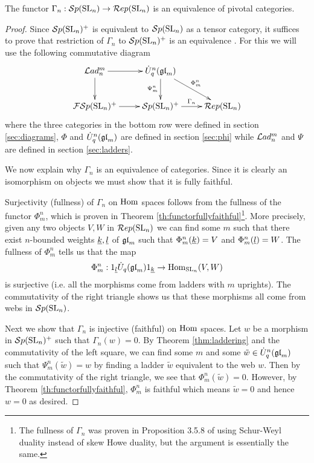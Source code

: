 \documentclass[11pt,leqno]{article}
\begin{document}
\begin{thm}\label{thm:main}
The functor $\Gamma_n: {\mathcal{S}p}({\rm{SL}}_n) \rightarrow \mathcal{R}ep({\rm{SL}}_n)$ is an equivalence of pivotal categories.
\end{thm}
\begin{proof}
Since ${\mathcal{S}p}({\rm{SL}}_n)^+ $ is equivalent to $ {\mathcal{S}p}({\rm{SL}}_n) $ as a tensor category, it suffices to prove that restriction of $ \Gamma_n $ to $ {\mathcal{S}p}({\rm{SL}}_n)^+ $ is an equivalence . For this we will use the following commutative diagram
\begin{equation}\label{diag:main}
\xymatrix{
\Lad_n^m \ar[r] \ar[d] & \dU^n(\gl_m) \ar[dr]^{\Phi_m^n} \ar[d]_{\Psi_m^n} & \\
\FSp(\SL_n)^+ \ar[r] & \Sp(\SL_n)^+ \ar[r]^{\Gamma_n} & \Rep(\SL_n) \\
}
\end{equation}
where the three categories in the bottom row were defined in section \ref{sec:diagrams}, $\Phi$ and $\dot{{{U}}}_q^n({\mathfrak{gl}}_m)$ are defined in section \ref{sec:phi} while $\mathcal{L}ad_n^m$ and $\Psi$ are defined in section \ref{sec:ladders}.

We now explain why $\Gamma_n$ is an equivalence of categories. Since it is clearly an isomorphism on objects we must show that it is fully faithful.

Surjectivity (fullness) of $\Gamma_n$ on $\operatorname{Hom}$ spaces follows from the fullness of the functor $ \Phi^n_m $, which is proven in Theorem \ref{th:functorfullyfaithful}\footnote{The fullness of $\Gamma_n$ was proven in Proposition 3.5.8 of \cite{0704.1503} using Schur-Weyl duality instead of skew Howe duality, but the argument is essentially the same.}.  More precisely, given any two objects $ V, W $ in $\mathcal{R}ep({\rm{SL}}_n) $ we can find some $m$ such that there exist $ n$-bounded weights $ {\underline{k}}, {\underline{l}} $ of $ {\mathfrak{gl}}_m$ such that $\Phi^n_m({\underline{k}}) = V$ and $\Phi^n_m({\underline{l}}) = W $. The fullness of $ \Phi^n_m $ tells us that the map
$$ \Phi^n_m : 1_{{\underline{l}}} \dot{{{U}}}_q({\mathfrak{gl}}_m) 1_{{\underline{k}}} \rightarrow \operatorname{Hom}_{{\rm{SL}}_n}(V, W) $$
is surjective (i.e. all the morphisms come from ladders with $m$ uprights). The commutativity of the right triangle shows us that these morphisms all come from webs in $ {\mathcal{S}p}({\rm{SL}}_n) $.

Next we show that $ \Gamma_n $ is injective (faithful) on $ \operatorname{Hom}$ spaces.  Let $w$ be a morphism in $ {\mathcal{S}p}({\rm{SL}}_n)^+ $ such that $\Gamma_n(w)=0$.  By Theorem \ref{thm:laddering} and the commutativity of the left square, we can find some $ m $ and some $\tilde{w} \in \dot{{{U}}}_q^n({\mathfrak{gl}}_m) $ such that $ \Psi^n_m(\tilde{w}) = w $ by finding a ladder $ \tilde{w} $ equivalent to the web $ w $. Then by the commutativity of the right triangle, we see that $ \Phi^n_m(\tilde{w}) = 0 $.  However, by Theorem \ref{th:functorfullyfaithful}, $\Phi_m^n$ is faithful which means $\tilde{w}=0$ and hence $w=0$ as desired.
\end{proof}
\end{document}
